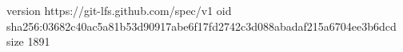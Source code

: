 version https://git-lfs.github.com/spec/v1
oid sha256:03682c40ac5a81b53d90917abe6f17fd2742c3d088abadaf215a6704ee3b6dcd
size 1891
